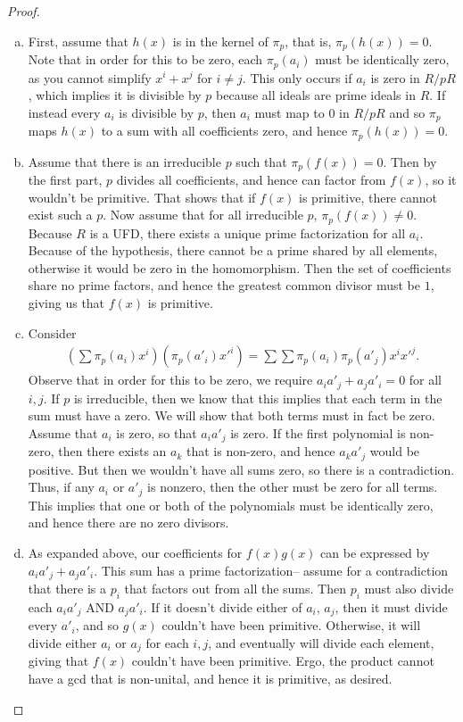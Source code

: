 \documentclass[num=1,duedate=02-03-21,course=Algebra\ II,proflastname=Walton]{hwtemplate}
\begin{document}
\begin{proof}
	\begin{enumerate}[(a).]
		\item First, assume that \(h(x)\) is in the kernel of \(\pi_p\), that is, \(\pi_p(h(x)) = 0\). Note that in order for this to be zero, each \(\pi_p(a_i)\) must be identically zero, as you cannot simplify \(x^{i}+x^{j}\) for \(i\neq j\). This only occurs if \(a_i\) is zero in \(R / pR\), which implies it is divisible by \(p\) because all ideals are prime ideals in \(R\). If instead every \(a_i\) is divisible by \(p\), then \(a_i\) must map to \(0\) in \(R/pR\) and so \(\pi_p\) maps \(h(x)\) to a sum with all coefficients zero, and hence \(\pi_p(h(x)) = 0\).
		\item Assume that there is an irreducible \(p\) such that \(\pi_p(f(x))=0\). Then by the first part, \(p\) divides all coefficients, and hence can factor from \(f(x)\), so it wouldn't be primitive. That shows that if \(f(x)\) is primitive, there cannot exist such a \(p\). Now assume that for all irreducible \(p\), \(\pi_p(f(x)) \neq 0\). Because \(R\) is a UFD, there exists a unique prime factorization for all \(a_i\). Because of the hypothesis, there cannot be a prime shared by all elements, otherwise it would be zero in the homomorphism. Then the set of coefficients share no prime factors, and hence the greatest common divisor must be \(1\), giving us that \(f(x)\) is primitive.
		\item Consider
			\begin{align*}
				\left( \sum \pi_p (a_i) x^{i} \right)\left( \pi_p(a'_i)x'^{i} \right) = \sum \sum \pi_p(a_i)\pi_p(a'_j) x^{i}x'^{j}.
			\end{align*}
			Observe that in order for this to be zero, we require \(a_ia'_j + a_ja'_i = 0\) for all \(i,j\). If \(p\) is irreducible, then we know that this implies that each term in the sum must have a zero. We will show that both terms must in fact be zero. Assume that \(a_i\) is zero, so that \(a_ia'_j\) is zero. If the first polynomial is non-zero, then there exists an \(a_k\) that is non-zero, and hence \(a_ka'_j\) would be positive. But then we wouldn't have all sums zero, so there is a contradiction. Thus, if any \(a_i\) or \(a'_j\) is nonzero, then the other must be zero for all terms. This implies that one or both of the polynomials must be identically zero, and hence there are no zero divisors.
		\item As expanded above, our coefficients for \(f(x)g(x)\) can be expressed by \(a_ia'_j + a_ja'_i\). This sum has a prime factorization-- assume for a contradiction that there is a \(p_i\) that factors out from all the sums. Then \(p_i\) must also divide each \(a_ia'_j\) AND \(a_ja'_i\). If it doesn't divide either of \(a_i\), \(a_j\), then it must divide every \(a'_i\), and so \(g(x)\) couldn't have been primitive. Otherwise, it will divide either \(a_i\) or \(a_j\) for each \(i,j\), and eventually will divide each element, giving that \(f(x)\) couldn't have been primitive. Ergo, the product cannot have a gcd that is non-unital, and hence it is primitive, as desired.
	\end{enumerate}
\end{proof}
\end{document}
